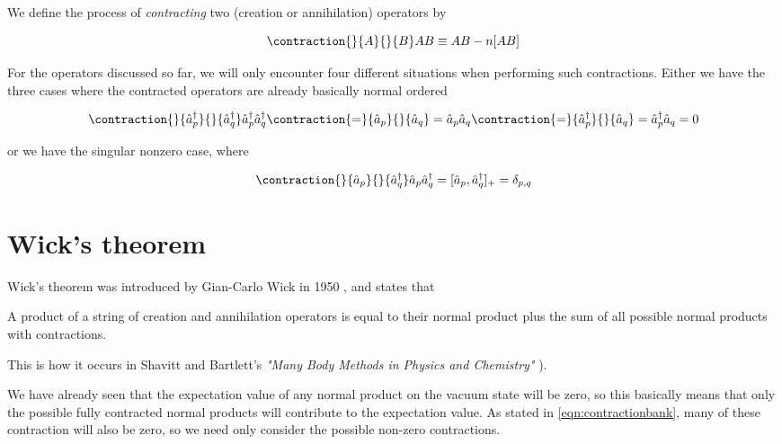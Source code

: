 We define the process of \emph{contracting} two (creation or annihilation) operators by

\begin{equation}
\contraction{}{A}{}{B}
AB \equiv AB - n[AB] 
\label{eqn:contractiondef}
\end{equation}

For the operators discussed so far, we will only encounter four different situations when performing such contractions. Either we have the three cases where the contracted operators are already basically normal ordered

\begin{equation}
\contraction{}{\hat{a}_p^\dagger}{}{\hat{a}_q^\dagger}
\hat{a}_p^\dagger \hat{a}_q^\dagger 
\contraction{=}{\hat{a}_p}{}{\hat{a}_q}
= \hat{a}_p \hat{a}_q
\contraction{=}{\hat{a}_p^\dagger}{}{\hat{a}_q}
 = \hat{a}_p^\dagger \hat{a}_q = 0
\label{eqn:contractionbank}
\end{equation}

or we have the singular nonzero case, where

\begin{equation}
\contraction{}{\hat{a}_p}{}{\hat{a}_q^\dagger}
\hat{a}_p \hat{a}_q^\dagger = [\hat{a}_p, \hat{a}_q^\dagger]_+ = \delta_{p,q}
\label{eqn:contractionbank2}
\end{equation}

\section{Wick's theorem}

Wick's theorem was introduced by Gian-Carlo Wick in 1950 \cite{Wick1950}, and states that 

\begin{theorem}
A product of a string of creation and annihilation operators is equal to their normal product plus the sum of all possible normal products with contractions.
\end{theorem}

This is how it occurs in Shavitt and Bartlett's  \emph{"Many Body Methods in Physics and Chemistry"} \cite{ShavittBartlett2009}).

We have already seen that the expectation value of any normal product on the vacuum state will be zero, so this basically means that only the possible fully contracted normal products will contribute to the expectation value. As stated in \ref{eqn:contractionbank}, many of these contraction will also be zero, so we need only consider the possible non-zero contractions. 

